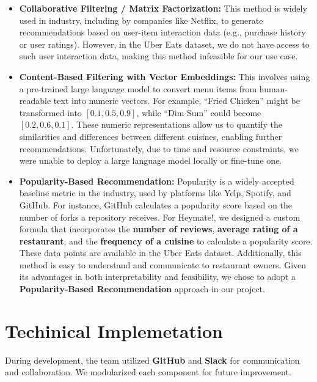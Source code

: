 \documentclass[
  11pt,
  a4paper,
  DIV=11,
  numbers=noendperiod]{scrartcl}
\providecommand{\tightlist}{%
  \setlength{\itemsep}{0pt}\setlength{\parskip}{0pt}}\usepackage{longtable,booktabs,array}
\begin{document}
\begin{itemize}
\tightlist
\item
  \textbf{Collaborative Filtering / Matrix Factorization:} This method
  is widely used in industry, including by companies like Netflix, to
  generate recommendations based on user-item interaction data (e.g.,
  purchase history or user ratings). However, in the Uber Eats dataset,
  we do not have access to such user interaction data, making this
  method infeasible for our use case.
\item
  \textbf{Content-Based Filtering with Vector Embeddings:} This involves
  using a pre-trained large language model to convert menu items from
  human-readable text into numeric vectors. For example, ``Fried
  Chicken'' might be transformed into \([0.1, 0.5, 0.9]\), while ``Dim
  Sum'' could become \([0.2, 0.6, 0.1]\). These numeric representations
  allow us to quantify the similarities and differences between
  different cuisines, enabling further recommendations. Unfortunately,
  due to time and resource constraints, we were unable to deploy a large
  language model locally or fine-tune one.
\item
  \textbf{Popularity-Based Recommendation:} Popularity is a widely
  accepted baseline metric in the industry, used by platforms like Yelp,
  Spotify, and GitHub. For instance, GitHub calculates a popularity
  score based on the number of forks a repository receives. For
  Heymate!, we designed a custom formula that incorporates the
  \textbf{number of reviews}, \textbf{average rating of a restaurant},
  and the \textbf{frequency of a cuisine} to calculate a popularity
  score. These data points are available in the Uber Eats dataset.
  Additionally, this method is easy to understand and communicate to
  restaurant owners. Given its advantages in both interpretability and
  feasibility, we chose to adopt a \textbf{Popularity-Based
  Recommendation} approach in our project.
\end{itemize}

\section{Techinical Implemetation}\label{techinical-implemetation}

During development, the team utilized \textbf{GitHub} and \textbf{Slack}
for communication and collaboration. We modularized each component for
future improvement.
\end{document}
